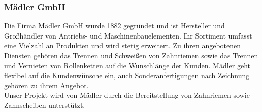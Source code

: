 \subsubsection{Mädler GmbH}
Die Firma Mädler GmbH wurde 1882 gegründet und ist Hersteller und Großhändler von Antriebs- und Maschinenbauelementen. Ihr Sortiment umfasst eine Vielzahl an Produkten und wird stetig erweitert. Zu ihren angebotenen Diensten gehören das Trennen und Schweißen von Zahnriemen sowie das Trennen und Vernieten von Rollenketten auf die Wunschlänge der Kunden. Mädler geht flexibel auf die Kundenwünsche ein, auch Sonderanfertigungen nach Zeichnung gehören zu ihrem Angebot.\cite{mädler}\\
Unser Projekt wird von Mädler durch die Bereitstellung von Zahnriemen sowie Zahnscheiben unterstützt.




